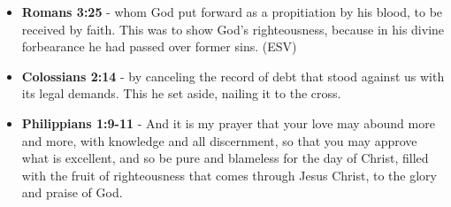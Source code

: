 \documentclass[11pt]{article}
\begin{document}
\begin{itemize}
\item \textbf{Romans 3:25} -  whom God put forward as a propitiation by his blood, to be received by faith.  This was to show God's righteousness, because in his divine forbearance he had passed over former sins.  (ESV)

\item \textbf{Colossians 2:14} - by canceling the record of debt that stood against us with its legal demands. This he set aside, nailing it to the cross.

\item \textbf{Philippians 1:9-11} - And it is my prayer that your love may abound more and more, with knowledge and all discernment, so that you may approve what is excellent, and so be pure and blameless for the day of Christ, filled with the fruit of righteousness that comes through Jesus Christ, to the glory and praise of God.
\end{itemize}
\end{document}
